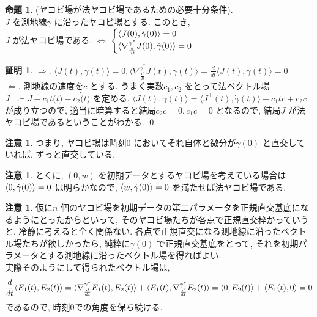 \documentclass[10pt, fleqn, label-section=none]{bxjsarticle}
\theoremstyle{definition}
\newtheorem{prop}[dfn]{命題}
\newtheorem*{pf*}{証明}
\newtheorem{remark}[dfn]{注意}
\newcommand{\tbra}[1]{\mleft\langle#1\mright\rangle}
\newcommand{\ntbra}[1]{\langle#1\rangle}
\newcommand{\LR}{\Leftrightarrow}
\newcommand{\naraba}{\Rightarrow}
\newcommand{\gyaku}{\Leftarrow}
\renewcommand{\-}{\hyphen}
\begin{document}
\begin{prop}(ヤコビ場が法ヤコビ場であるための必要十分条件).\\
$J$ を測地線$\gamma$ に沿ったヤコビ場とする. このとき, \\
$J$ が法ヤコビ場である. $\LR$ $\begin{cases} \tbra{J(0), \dot \gamma(0)} = 0 \\ \ntbra{\nabla^{\gamma ^* } _{\frac{d}{dt}} J(0), \dot \gamma (0) } = 0 \end {cases} $

\end{prop}
\begin{pf*}
$\naraba.$ $\ntbra{J(t), \dot \gamma (t) } = 0, \ntbra{\nabla^{\gamma ^* } _{\frac{d}{dt}} J(t), \dot \gamma(t) } = \frac{d}{dt} \ntbra{J(t), \dot \gamma (t) } = 0$ \\
$\gyaku.$ 測地線の速度を$c$ とする. うまく実数$c_1, c_2$ をとって法ベクトル場 $J^\perp \coloneqq J - c_1 t \dot (t) - c_2 \dot (t)$ を定める. 
$\ntbra{J(t), \dot \gamma (t)} = \ntbra{J ^\perp (t) , \dot \gamma (t)  } + c_1 t c + c_2 c $ が成り立つので, 適当に暗算すると結局$c_2 c = 0, c_1 c = 0$ となるので, 結局$J$ が法ヤコビ場であるということがわかる. 
\qed
\end{pf*}

\begin{remark}
つまり, ヤコビ場は時刻$0$ においてそれ自体と微分が$\dot \gamma (0)$ と直交していれば, ずっと直交している. 
\end{remark}

\begin{remark}
とくに, $(0, w)$ を初期データとするヤコビ場を考えている場合は $\tbra{0 , \dot \gamma (0) } = 0$ は明らかなので, $\tbra{w , \dot \gamma (0)} = 0$ を満たせば法ヤコビ場である.
\end{remark}

\begin{remark}
仮に$n$ 個のヤコビ場を初期データの第二パラメータを正規直交基底になるようにとったからといって, そのヤコビ場たちが各点で正規直交枠かっていうと, 冷静に考えると全く関係ない. 各点で正規直交になる測地線に沿ったベクトル場たちが欲しかったら, 純粋に$\gamma (0)$ で正規直交基底をとって, それを初期パラメータとする測地線に沿ったベクトル場を得ればよい. \\ 実際そのようにして得られたベクトル場は,
\begin{align*}\frac{d}{dt} \tbra{E_1 (t), E_2 (t) } = \ntbra{\nabla ^{\gamma ^* } _{\frac{d}{dt} } E_1 (t) , E_2 (t)  } + \ntbra{E_1 (t), \nabla ^{\gamma ^* } _{\frac{d}{dt} }  E_2 (t)} = \tbra{0, E_2 (t)} + \tbra{E_1(t), 0} = 0 \end{align*}
であるので, 時刻$0$での角度を保ち続ける.
\end{remark}
\end{document}
